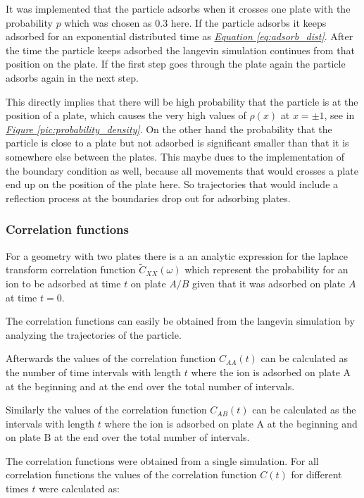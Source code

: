 \documentclass[a4paper, parskip=half]{scrartcl}
\newcommand{\myFigRef}[1]{\textit{\hyperref[#1]{Figure \ref*{#1}}}}
\newcommand{\myEqRef}[1]{\textit{\hyperref[eq:#1]{Equation \ref*{eq:#1}}}}
\begin{document}
It was implemented that the particle adsorbs when it crosses one plate with the probability $p$ which was chosen as $0.3$ here. 
If the particle adsorbs it keeps adsorbed for an exponential distributed time as \myEqRef{adsorb_dist}. After the time the particle keeps adsorbed the langevin simulation continues from that position on the plate. If the first step goes through the plate again the particle adsorbs again in the next step.

This directly implies that there will be high probability that the particle is at the position of a plate, which causes the very high values of $\rho(x)$ at $x = \pm 1$, see in \myFigRef{pic:probability_density}. On the other hand the probability that the particle is close to a plate but not adsorbed is significant smaller than that it is somewhere else between the plates. This maybe dues to the implementation of the boundary condition as well, because all movements that would crosses a plate end up on the position of the plate here. So trajectories that would include a reflection process at the boundaries drop out for adsorbing plates. 


\subsubsection{Correlation functions}\label{correlation_functions}
For a geometry with two plates there is a an analytic expression for the laplace transform correlation function $\widetilde{C}_{XX}(\omega)$ which represent the probability for an ion to be adsorbed at time $t$ on plate $A/B$ given that it was adsorbed on plate $A$ at time $t=0$.

The correlation functions can easily be obtained from the langevin simulation by analyzing the trajectories of the particle. 

Afterwards the values of the correlation function $C_{AA}(t)$ can be calculated as the number of time intervals with length $t$ where the ion is adsorbed on plate $\mathrm{A}$ at the beginning and at the end over the total number of intervals.

Similarly the values of the correlation function $C_{AB}(t)$ can be calculated as the intervals with length $t$ where the ion is adsorbed on plate $\mathrm{A}$ at the beginning and on plate $\mathrm{B}$ at the end over the total number of intervals.

The correlation functions were obtained from a single simulation. For all correlation functions the values of the correlation function $C(t)$ for different times $t$ were calculated as:
\end{document}
